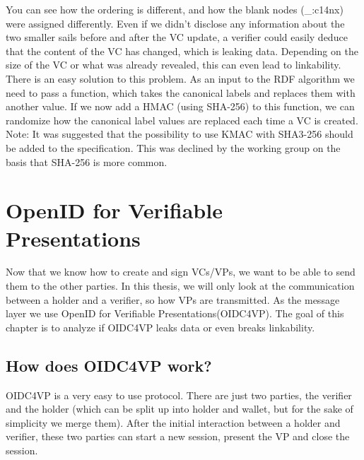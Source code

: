 \documentclass[
	a4paper               %
	,BCOR=0mm            %
	,bibliography=totoc   %
	,listof=totoc         %
	,monolingual
	,twoside=false
]{bfhthesis}              %
\begin{document}
You can see how the ordering is different, and how the blank nodes (\_:c14nx) were assigned differently.
Even if we didn't disclose any information about the two smaller sails before and after the VC update, a verifier could easily deduce that the content of the VC has changed, which is leaking data. Depending on the size of the VC or what was already revealed, this can even lead to linkability.\\

There is an easy solution to this problem.
As an input to the RDF algorithm we need to pass a function, which takes the canonical labels and replaces them with another value.
If we now add a HMAC (using SHA-256) to this function, we can randomize how the canonical label values are replaced each time a VC is created.\\

Note: It was suggested that the possibility to use KMAC with SHA3-256 should be added to the specification. This was declined by the working group on the basis that SHA-256 is more common.


\chapter{OpenID for Verifiable Presentations}
Now that we know how to create and sign VCs/VPs, we want to be able to send them to the other parties.
In this thesis, we will only look at the communication between a holder and a verifier, so how VPs are transmitted.
As the message layer we use OpenID for Verifiable Presentations(OIDC4VP)\cite{oidc4vp}.
The goal of this chapter is to analyze if OIDC4VP leaks data or even breaks linkability.

\section{How does OIDC4VP work?}
OIDC4VP is a very easy to use protocol.
There are just two parties, the verifier and the holder (which can be split up into holder and wallet, but for the sake of simplicity we merge them).
After the initial interaction between a holder and verifier, these two parties can start a new session, present the VP and close the session.
\end{document}
